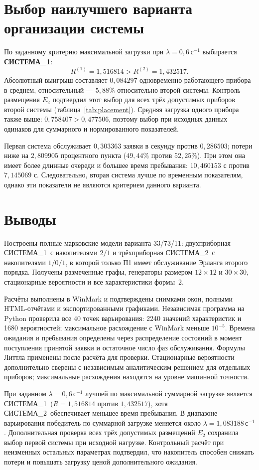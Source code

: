 \documentclass[a4paper,12pt]{article}
\newcommand{\sysone}{СИСТЕМА\_1}
\newcommand{\systwo}{СИСТЕМА\_2}
\newcommand{\secunit}{\,\text{с}^{-1}}
\begin{document}
\section{Выбор наилучшего варианта организации системы}
По заданному критерию максимальной загрузки при $\lambda=0{,}6\secunit$ выбирается \textbf{\sysone}:
\[
R^{(1)}=1{,}516814>R^{(2)}=1{,}432517.
\]
Абсолютный выигрыш составляет $0{,}084297$ одновременно работающего прибора в среднем, относительный --- $5{,}88\%$ относительно второй системы. Контроль размещения $E_2$ подтвердил этот выбор для всех трёх допустимых приборов второй системы (таблица~\ref{tab:placement}). Средняя загрузка одного прибора также выше: $0{,}758407>0{,}477506$, поэтому выбор при исходных данных одинаков для суммарного и нормированного показателей.

Первая система обслуживает $0{,}303363$ заявки в секунду против $0{,}286503$; потери ниже на $2{,}809905$ процентного пункта ($49{,}44\%$ против $52{,}25\%$). При этом она имеет более длинные очереди и большее время пребывания: $10{,}460153$ с против $7{,}145069$ с. Следовательно, вторая система лучше по временным показателям, однако эти показатели не являются критерием данного варианта.

\section{Выводы}
Построены полные марковские модели варианта 33/73/11: двухприборная \sysone\ с накопителями $2/1$ и трёхприборная \systwo\ с накопителями $1/0/1$, в которой только П1 имеет обслуживание Эрланга второго порядка. Получены размеченные графы, генераторы размером $12\times12$ и $30\times30$, стационарные вероятности и все характеристики формы~2.

Расчёты выполнены в WinMark и подтверждены снимками окон, полными HTML-отчётами и экспортированными графиками. Независимая программа на Python проверила все 40 точек варьирования: 2240 значений характеристик и 1680 вероятностей; максимальное расхождение с WinMark меньше $10^{-5}$. Времена ожидания и пребывания определены через распределение состояний в момент поступления принятой заявки и остаточное число фаз обслуживания. Формулы Литтла применены после расчёта для проверки. Стационарные вероятности дополнительно сверены с независимым аналитическим решением для отдельных приборов; максимальные расхождения находятся на уровне машинной точности.

При заданном $\lambda=0{,}6\secunit$ лучшей по максимальной суммарной загрузке является \sysone\ ($R=1{,}516814$ против $1{,}432517$), хотя \systwo\ обеспечивает меньшее время пребывания. В диапазоне варьирования победитель по суммарной загрузке меняется около $\lambda=1{,}083188\secunit$. Дополнительная проверка всех трёх допустимых размещений $E_2$ сохранила выбор первой системы при исходной нагрузке. Контрольный расчёт при неизменных остальных параметрах подтвердил, что накопитель способен снижать потери и повышать загрузку ценой дополнительного ожидания.
\end{document}
